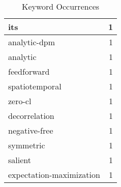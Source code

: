 \begin{table}[h]
\begin{tabular}{|l|r|}
\hline
its & 1 \\
\hline
analytic-dpm & 1 \\
\hline
analytic & 1 \\
\hline
feedforward & 1 \\
\hline
spatiotemporal & 1 \\
\hline
zero-cl & 1 \\
\hline
decorrelation & 1 \\
\hline
negative-free & 1 \\
\hline
symmetric & 1 \\
\hline
salient & 1 \\
\hline
expectation-maximization & 1 \\
\hline
\end{tabular}
\caption{Keyword Occurrences}
\end{table}
